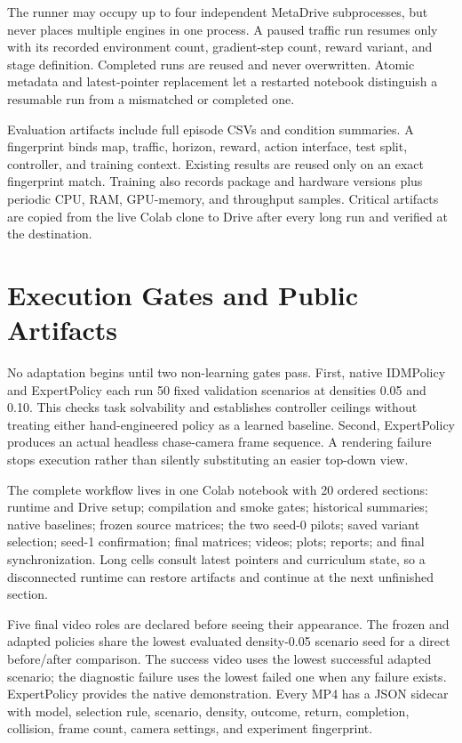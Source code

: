 \documentclass[10pt,twocolumn]{article}
\begin{document}
The runner may occupy up to four independent MetaDrive subprocesses, but never places
multiple engines in one process. A paused traffic run resumes only with its recorded
environment count, gradient-step count, reward variant, and stage definition. Completed
runs are reused and never overwritten. Atomic metadata and latest-pointer replacement
let a restarted notebook distinguish a resumable run from a mismatched or completed one.

Evaluation artifacts include full episode CSVs and condition summaries. A fingerprint
binds map, traffic, horizon, reward, action interface, test split, controller, and
training context. Existing results are reused only on an exact fingerprint match.
Training also records package and hardware versions plus periodic CPU, RAM, GPU-memory,
and throughput samples. Critical artifacts are copied from the live Colab clone to Drive
after every long run and verified at the destination.

\section{Execution Gates and Public Artifacts}
No adaptation begins until two non-learning gates pass. First, native IDMPolicy and
ExpertPolicy each run 50 fixed validation scenarios at densities 0.05 and 0.10. This
checks task solvability and establishes controller ceilings without treating either
hand-engineered policy as a learned baseline. Second, ExpertPolicy produces an actual
headless chase-camera frame sequence. A rendering failure stops execution rather than
silently substituting an easier top-down view.

The complete workflow lives in one Colab notebook with 20 ordered sections: runtime and
Drive setup; compilation and smoke gates; historical summaries; native baselines; frozen
source matrices; the two seed-0 pilots; saved variant selection; seed-1 confirmation;
final matrices; videos; plots; reports; and final synchronization. Long cells consult
latest pointers and curriculum state, so a disconnected runtime can restore artifacts
and continue at the next unfinished section.

Five final video roles are declared before seeing their appearance. The frozen and
adapted policies share the lowest evaluated density-0.05 scenario seed for a direct
before/after comparison. The success video uses the lowest successful adapted scenario;
the diagnostic failure uses the lowest failed one when any failure exists. ExpertPolicy
provides the native demonstration. Every MP4 has a JSON sidecar with model, selection
rule, scenario, density, outcome, return, completion, collision, frame count, camera
settings, and experiment fingerprint.
\end{document}
